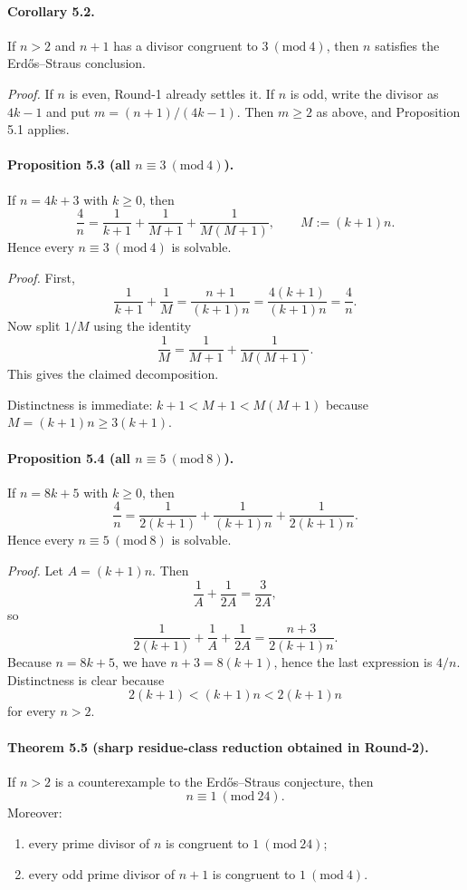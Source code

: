 \paragraph{Corollary 5.2.}
If $n>2$ and $n+1$ has a divisor congruent to $3 \ (\mathrm{mod}\ 4)$, then $n$ satisfies the Erd\H{o}s--Straus conclusion.

\emph{Proof.}
If $n$ is even, Round-1 already settles it. If $n$ is odd, write the divisor as $4k-1$ and put $m=(n+1)/(4k-1)$. Then $m\ge 2$ as above, and Proposition 5.1 applies.

\paragraph{Proposition 5.3 (all $n\equiv 3 \ (\mathrm{mod}\ 4)$).}
If $n=4k+3$ with $k\ge 0$, then
\[
 \frac{4}{n}=\frac{1}{k+1}+\frac{1}{M+1}+\frac{1}{M(M+1)},
\qquad M:=(k+1)n.
\]
Hence every $n\equiv 3 \ (\mathrm{mod}\ 4)$ is solvable.

\emph{Proof.}
First,
\[
\frac{1}{k+1}+\frac{1}{M}
 =\frac{n+1}{(k+1)n}
 =\frac{4(k+1)}{(k+1)n}
 =\frac{4}{n}.
\]
Now split $1/M$ using the identity
\[
 \frac{1}{M}=\frac{1}{M+1}+\frac{1}{M(M+1)}.
\]
This gives the claimed decomposition.

Distinctness is immediate: $k+1<M+1<M(M+1)$ because $M=(k+1)n\ge 3(k+1)$.

\paragraph{Proposition 5.4 (all $n\equiv 5 \ (\mathrm{mod}\ 8)$).}
If $n=8k+5$ with $k\ge 0$, then
\[
 \frac{4}{n}
 =\frac{1}{2(k+1)}+\frac{1}{(k+1)n}+\frac{1}{2(k+1)n}.
\]
Hence every $n\equiv 5 \ (\mathrm{mod}\ 8)$ is solvable.

\emph{Proof.}
Let $A=(k+1)n$. Then
\[
\frac{1}{A}+\frac{1}{2A}=\frac{3}{2A},
\]
so
\[
\frac{1}{2(k+1)}+\frac{1}{A}+\frac{1}{2A}
 =\frac{n+3}{2(k+1)n}.
\]
Because $n=8k+5$, we have $n+3=8(k+1)$, hence the last expression is $4/n$.
Distinctness is clear because
\[
2(k+1)<(k+1)n<2(k+1)n
\]
for every $n>2$.

\paragraph{Theorem 5.5 (sharp residue-class reduction obtained in Round-2).}
If $n>2$ is a counterexample to the Erd\H{o}s--Straus conjecture, then
\[
 n\equiv 1 \ (\mathrm{mod}\ 24).
\]
Moreover:
\begin{enumerate}
\item every prime divisor of $n$ is congruent to $1 \ (\mathrm{mod}\ 24)$;
\item every odd prime divisor of $n+1$ is congruent to $1 \ (\mathrm{mod}\ 4)$.
\end{enumerate}

